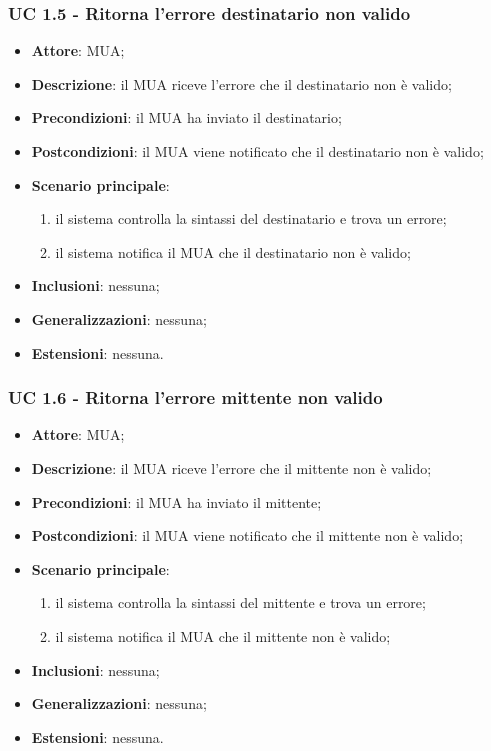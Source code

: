     \subsubsection{UC 1.5 - Ritorna l'errore destinatario non valido} \label{sec:UC1.5}
    \begin{itemize}
        \item \textbf{Attore}: MUA;
        \item \textbf{Descrizione}: il MUA riceve l'errore che il destinatario non è valido;
        \item \textbf{Precondizioni}: il MUA ha inviato il destinatario;
        \item \textbf{Postcondizioni}: il MUA viene notificato che il destinatario non è valido;
        \item \textbf{Scenario principale}:
            \begin{enumerate}
                \item il sistema controlla la sintassi del destinatario e trova un errore;
                \item il sistema notifica il MUA che il destinatario non è valido;
            \end{enumerate}
        \item \textbf{Inclusioni}: nessuna;
        \item \textbf{Generalizzazioni}: nessuna;
        \item \textbf{Estensioni}: nessuna.
    \end{itemize}

    \subsubsection{UC 1.6 - Ritorna l'errore mittente non valido} \label{sec:UC1.6}
    \begin{itemize}
        \item \textbf{Attore}: MUA;
        \item \textbf{Descrizione}: il MUA riceve l'errore che il mittente non è valido;
        \item \textbf{Precondizioni}: il MUA ha inviato il mittente;
        \item \textbf{Postcondizioni}: il MUA viene notificato che il mittente non è valido;
        \item \textbf{Scenario principale}:
            \begin{enumerate}
                \item il sistema controlla la sintassi del mittente e trova un errore;
                \item il sistema notifica il MUA che il mittente non è valido;
            \end{enumerate}
        \item \textbf{Inclusioni}: nessuna;
        \item \textbf{Generalizzazioni}: nessuna;
        \item \textbf{Estensioni}: nessuna.
    \end{itemize}

